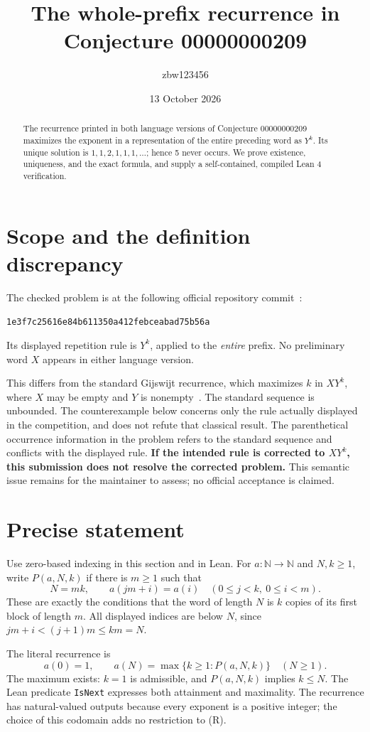 \documentclass[11pt,a4paper]{article}
\title{The whole-prefix recurrence in Conjecture 00000000209}
\author{zbw123456}
\date{13 October 2026}
\begin{document}
\maketitle
\begin{abstract}
The recurrence printed in both language versions of Conjecture 00000000209
maximizes the exponent in a representation of the entire preceding word as
$Y^k$. Its unique solution is $1,1,2,1,1,1,\ldots$; hence 5 never occurs.
We prove existence, uniqueness, and the exact formula, and supply a
self-contained, compiled Lean 4 verification.
\end{abstract}

\section{Scope and the definition discrepancy}
The checked problem is at the following official repository commit~\cite{problem}:
\begin{center}\small\texttt{1e3f7c25616e84b611350a412febceabad75b56a}\end{center}
Its displayed repetition rule is $Y^k$, applied to the \emph{entire}
prefix. No preliminary word $X$ appears in either language version.

This differs from the standard Gijswijt recurrence, which maximizes $k$
in $XY^k$, where $X$ may be empty and $Y$ is nonempty~\cite{gijswijt}.
The standard sequence is unbounded. The counterexample below concerns only
the rule actually displayed in the competition, and does not refute that
classical result. The parenthetical occurrence information in the problem
refers to the standard sequence and conflicts with the displayed rule.
\textbf{If the intended rule is corrected to $XY^k$, this submission does
not resolve the corrected problem.} This semantic issue remains for the
maintainer to assess; no official acceptance is claimed.

\section{Precise statement}
Use zero-based indexing in this section and in Lean. For $a:\mathbb N\to
\mathbb N$ and $N,k\geq1$, write $P(a,N,k)$ if there is $m\geq1$ such that
\[
 N=mk,\qquad
 a(jm+i)=a(i)\quad(0\leq j<k,\ 0\leq i<m).
\]
These are exactly the conditions that the word of length $N$ is $k$
copies of its first block of length $m$. All displayed indices are below
$N$, since $jm+i<(j+1)m\leq km=N$.

The literal recurrence is
\[
 a(0)=1,\qquad
 a(N)=\max\{k\geq1:P(a,N,k)\}\quad(N\geq1).                 \tag{R}
\]
The maximum exists: $k=1$ is admissible, and $P(a,N,k)$ implies $k\leq N$.
The Lean predicate \texttt{IsNext} expresses both attainment and maximality.
The recurrence has natural-valued outputs because every exponent is a
positive integer; the choice of this codomain adds no restriction to (R).
\end{document}
